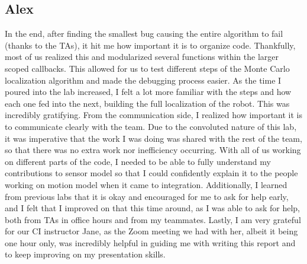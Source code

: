 \documentclass{article}
\begin{document}
\subsection{Alex}
In the end, after finding the smallest bug causing the entire algorithm to fail (thanks to the TAs), it hit me how important it is to organize code. Thankfully, most of us realized this and modularized several functions within the larger scoped callbacks. This allowed for us to test different steps of the Monte Carlo localization algorithm and made the debugging process easier. As the time I poured into the lab increased, I felt a lot more familiar with the steps and how each one fed into the next, building the full localization of the robot. This was incredibly gratifying. From the communication side, I realized how important it is to communicate clearly with the team. Due to the convoluted nature of this lab, it was imperative that the work I was doing was shared with the rest of the team, so that there was no extra work nor inefficiency occurring. With all of us working on different parts of the code, I needed to be able to fully understand my contributions to sensor model so that I could confidently explain it to the people working on motion model when it came to integration. Additionally, I learned from previous labs that it is okay and encouraged for me to ask for help early, and I felt that I improved on that this time around, as I was able to ask for help, both from TAs in office hours and from my teammates. Lastly, I am very grateful for our CI instructor Jane, as the Zoom meeting we had with her, albeit it being one hour only, was incredibly helpful in guiding me with writing this report and to keep improving on my presentation skills.
\end{document}
